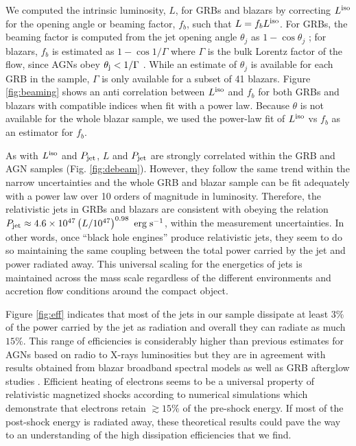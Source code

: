 \documentclass[12pt]{article}
\begin{document}
We computed the intrinsic luminosity, $L$, for GRBs and blazars by correcting  $L^{\rm iso}$ for the opening angle or beaming factor, $f_b$, such that $L = f_b L^{\rm iso}$. For GRBs, the beaming factor is computed from the jet opening angle $\theta_j$ as $1-\cos \theta_j$ \cite{frail01}; for blazars, $f_b$ is estimated as $1-\cos 1/\Gamma$ where $\Gamma$ is the bulk Lorentz factor of the flow, since AGNs obey $\theta_{\rm j}<1/\Gamma$ \cite{jorstad05,push09}.
While an estimate of $\theta_j$ is available for each GRB in the sample, $\Gamma$ is only available for a subset of 41 blazars. Figure \ref{fig:beaming} shows an anti correlation between $L^{\rm iso}$ and $f_b$ for both GRBs and blazars with compatible indices when fit with a power law. Because $\theta$ is not available for the whole blazar sample, we used the power-law fit of $L^{\rm iso}$ vs $f_b$ as an estimator for $f_b$.

As with $L^{\rm iso}$ and $P_{\rm jet}$, $L$ and $P_{\rm jet}$ are strongly correlated within the GRB and AGN samples (Fig. \ref{fig:debeam}). However, they follow the same trend within the narrow uncertainties and the whole GRB and blazar sample can be fit adequately with a power law over 10 orders of magnitude in luminosity. 
Therefore, the relativistic jets in GRBs and blazars are consistent with obeying the relation $P_{\rm jet} \approx 4.6 \times 10^{47} \left( L/10^{47} \right)^{0.98} \ {\rm erg \; s}^{-1}$, within the measurement uncertainties.
%
In other words, once ``black hole engines'' produce relativistic jets, they seem to do so maintaining the same coupling 
between the total power carried by the jet and power radiated away. This universal scaling for the energetics of jets is maintained across the mass scale regardless of the different environments and accretion flow conditions around the compact object. 

Figure \ref{fig:eff} indicates that most of the jets in our sample dissipate at least $3\%$ of the power carried by the jet as radiation and overall they can radiate as much $15\%$. This range of efficiencies is considerably higher than previous estimates for AGNs based on radio to X-rays luminosities  \cite{celotti93,yuan09} but they are in agreement with results obtained from blazar broadband spectral models \cite{celotti08,ghise10} as well as GRB afterglow studies \cite{fan06,zhang07,racusin11}.
Efficient heating of electrons seems to be a universal property of relativistic magnetized shocks according to numerical simulations \cite{sironi11} which demonstrate that electrons retain $\gtrsim 15\%$ of the pre-shock energy. If most of the post-shock energy is radiated away, these theoretical results could pave the way to an understanding of the high dissipation efficiencies that we find.
\end{document}
